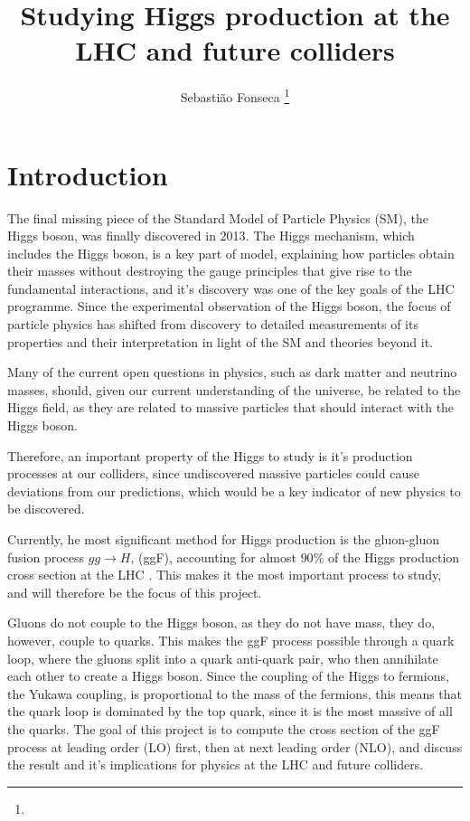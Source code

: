 \documentclass[EPJ,twocolumn]{webofc}
\title{ Studying Higgs production at the LHC and future colliders}
\author{Sebastião Fonseca\inst{1} \fnsep\thanks{\email{sebastiao.m.fonseca@tecnico.ulisboa.pt}}}
\institute{
Instituto Superior T\'ecnico, Lisboa, Portugal
\vskip 2mm
{\normalfont\normalsize\textsf Project supervisor: João Pires}
\mbox{}\hfill\today\hspace*{16mm}
}
\begin{document}
\maketitle

\section{\label{sec:intro}Introduction}

The final missing piece of the Standard Model of Particle Physics (SM), the Higgs boson, was finally discovered in 2013\cite{Higgs}.
The Higgs mechanism, which includes the Higgs boson, is a key part of model, explaining how particles obtain their masses without destroying the gauge principles that give rise to the fundamental interactions, and it's discovery was one of the key goals of the LHC programme. 
Since the experimental observation of the Higgs boson, the focus of particle physics has shifted from discovery to detailed measurements of its properties and their interpretation in light of the SM and theories beyond it.

Many of the current open questions in physics, such as dark matter and neutrino masses, should, given our current understanding of the universe, be related to the Higgs field, as they are related to massive particles that should interact with the Higgs boson.

Therefore, an important property of the Higgs to study is it's production processes at our colliders, since undiscovered massive particles could cause deviations from our predictions, which would be a key indicator of new physics to be discovered.

Currently, he most significant method for Higgs production is the gluon-gluon fusion process $gg\rightarrow H$, (ggF), accounting for almost $90\%$ of the Higgs production cross section at the LHC \cite{ATLAS:2015egz}. 
This makes it the most important process to study, and will therefore be the focus of this project.

Gluons do not couple to the Higgs boson, as they do not have mass, they do, however, couple to quarks. This makes the ggF process possible through a quark loop, where the gluons split into a quark anti-quark pair, who then annihilate each other to create a Higgs boson. 
Since the coupling of the Higgs to fermions, the Yukawa coupling, is proportional to the mass of the fermions, this means that the quark loop is dominated by the top quark, since it is the most massive of all the quarks. 
The goal of this project is to compute the cross section of the ggF process at leading order (LO) first, then at next leading order (NLO), and discuss the result and it's implications for physics at the LHC and future colliders.
\end{document}
